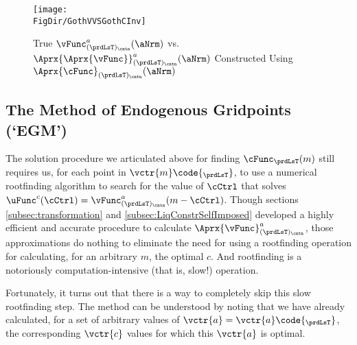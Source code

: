 \documentclass[\econtexRoot/SolvingMicroDSOPs]{subfiles}
\begin{document}
\hypertarget{GothVVSGothCInv}{}
\begin{figure}
  \centerline{\texttt{[image: \\FigDir/GothVVSGothCInv]}}
  \caption{True $\vFunc^{a}_{(\prdLsT)_\cntn}(\aNrm)$ vs. $\Aprx{\Aprx{\vFunc}}_{(\prdLsT)_\cntn}^{a}(\aNrm)$ Constructed Using $\Aprx{\cFunc}_{(\prdLsT)_\cntn}(\aNrm)$}
  \label{fig:GothVVSGothCInv}
\end{figure}

\hypertarget{the-method-of-endogenous-gridpoints}{}
\subsection{The Method of Endogenous Gridpoints (`EGM')}\label{subsec:egm}

The solution procedure we articulated above for finding $\cFunc_{\prdLsT}(m)$ still requires us, for each point in $\vctr{m}\code{_{\prdLsT}}$, to use a numerical rootfinding algorithm to search for the value of $\cCtrl$ that solves $\uFunc^{c}(\cCtrl) = \vFunc^{a}_{(\prdLsT)_\cntn}(m-\cCtrl)$.  Though sections \ref{subsec:transformation} and \ref{subsec:LiqConstrSelfImposed} developed a highly efficient and accurate procedure to calculate $\Aprx{\vFunc}^{a}_{(\prdLsT)_\cntn}$, those approximations do nothing to eliminate the need for using a rootfinding operation for calculating, for an arbitrary $m$, the optimal $c$.  And rootfinding is a notoriously computation-intensive (that is, slow!) operation.

Fortunately, it turns out that there is a way to completely skip this slow rootfinding step.  The method can be understood by noting that we have already calculated, for a set of arbitrary values of $\vctr{a}=\vctr{a}\code{_{\prdLsT}}$, the corresponding $\vctr{c}$ values for which this $\vctr{a}$ is optimal.
\end{document}
